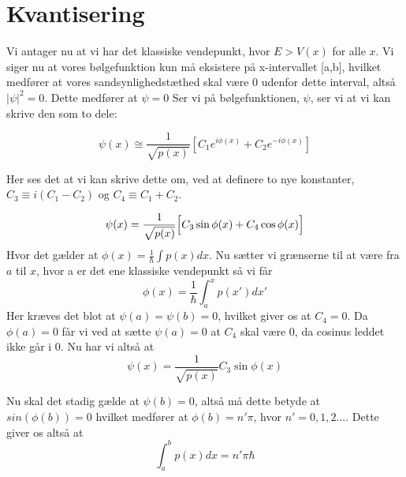 \section{Kvantisering}
Vi antager nu at vi har det klassiske vendepunkt, hvor $E > V(x) $ for alle $ x$. Vi siger nu at vores bølgefunktion kun må eksistere på x-intervallet [a,b], hvilket medfører at vores sandsynlighedstæthed skal være 0 udenfor dette interval, altså $|\psi|^2 = 0$. Dette medfører at $\psi = 0$
Ser vi på bølgefunktionen, $\psi$, ser vi at vi kan skrive den som to dele:

\begin{equation}
  \psi(x) \cong \frac{1}{\sqrt{p(x)}}\left[C_1e^{i\phi(x)}+C_2e^{-i\phi(x)}\right]
  \label{eq:kvantiseringStart}
\end{equation}

Her ses det at vi kan skrive dette om, ved at definere to nye konstanter, $C_3 \equiv i(C_1-C_2)$ og $C_4 \equiv C_1+C_2$.

\begin{equation}
  \psi(x) = \frac{1}{\sqrt{p(x)}}
  \Bigl[    C_3\sin{\phi(x)}+C_4\cos{\phi(x)}   \Bigr]
  \label{eq:kvantiseringSinCos}
\end{equation}
Hvor det gælder at $\phi(x) = \frac{1}{\hbar}\int p(x) dx$. Nu sætter vi grænserne til at være fra $a$ til $x$, hvor a er det ene klassiske vendepunkt så vi får
\begin{equation}
  \phi(x) = \frac{1}{\hbar}\int_{a}^{x} p(x')dx'
\end{equation}
Her kræves det blot at $\psi(a) = \psi(b) = 0$, hvilket giver os at $C_4 = 0$. Da $\phi(a) = 0$ får vi ved at sætte $\psi(a) = 0$ at $C_4$ skal være 0, da cosinus leddet ikke går i 0.
Nu har vi altså at
\begin{equation}
  \psi(x) = \frac{1}{\sqrt{p(x)}}C_3\sin{\phi(x)}
\end{equation}

Nu skal det stadig gælde at $\psi(b) = 0$, altså må dette betyde at $sin(\phi(b)) = 0$ hvilket medfører at $\phi(b) = n'\pi$, hvor $n' = 0,1,2...$.
Dette giver os altså at
\begin{equation}
  \int_{a}^{b} p(x) dx = n'\pi\hbar
  \label{eq:kvantiDone}
\end{equation}
